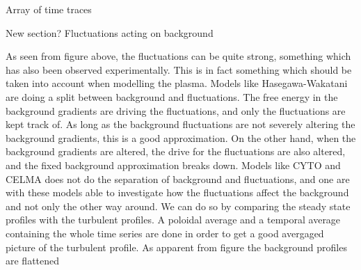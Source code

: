 Array of time traces


New section? Fluctuations acting on background


As seen from figure above, the fluctuations can be quite strong, something which has also been observed experimentally.
This is in fact something which should be taken into account when modelling the plasma.
Models like Hasegawa-Wakatani are doing a split between background and fluctuations.
The free energy in the background gradients are driving the fluctuations, and only the fluctuations are kept track of.
As long as the background fluctuations are not severely altering the background gradients, this is a good approximation.
On the other hand, when the background gradients are altered, the drive for the fluctuations are also altered, and the fixed background approximation breaks down.
Models like CYTO and CELMA does not do the separation of background and fluctuations, and one are with these models able to investigate how the fluctuations affect the background and not only the other way around.
We can do so by comparing the steady state profiles with the turbulent profiles.
A poloidal average and a temporal average containing the whole time series are done in order to get a good avergaged picture of the turbulent profile.
As apparent from figure
the background profiles are flattened
%
